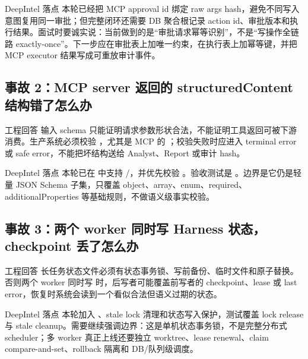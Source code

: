 \begin{analysisBox}{DeepIntel 落点}
本轮已经把 MCP approval id 绑定 raw args hash，避免不同写入意图复用同一审批；但完整闭环还需要 DB 聚合根记录 action id、审批版本和执行结果。面试时要诚实说：当前做到的是“审批请求幂等识别”，不是“写操作全链路 exactly-once”。下一步应在审批表上加唯一约束，在执行表上加幂等键，并把 MCP executor 结果写成可重放审计事件。
\end{analysisBox}

\subsection{事故 2：MCP server 返回的 structuredContent 结构错了怎么办}
\begin{qaBox}{工程回答}
输入 schema 只能证明请求参数形状合法，不能证明工具返回可被下游消费。生产系统必须校验 ，尤其是 MCP 的 ；校验失败时应进入 terminal error 或 safe error，不能把坏结构送给 Analyst、Report 或审计 hash。
\end{qaBox}

\begin{analysisBox}{DeepIntel 落点}
本轮已在  中支持 /，并优先校验 。验收测试是 。边界是它仍是轻量 JSON Schema 子集，只覆盖 object、array、enum、required、additionalProperties 等基础规则，不做语义级事实校验。
\end{analysisBox}

\subsection{事故 3：两个 worker 同时写 Harness 状态，checkpoint 丢了怎么办}
\begin{qaBox}{工程回答}
长任务状态文件必须有状态事务锁、写前备份、临时文件和原子替换。否则两个 worker 同时写  时，后写者可能覆盖前写者的 checkpoint、lease 或 last error，恢复时系统会读到一个看似合法但语义过期的状态。
\end{qaBox}

\begin{analysisBox}{DeepIntel 落点}
本轮加入 、stale lock 清理和状态写入保护，测试覆盖 lock release 与 stale cleanup。需要继续强调边界：这是单机状态事务锁，不是完整分布式 scheduler；多 worker 真正上线还要独立 worktree、lease renewal、claim compare-and-set、rollback 隔离和 DB/队列级调度。
\end{analysisBox}

